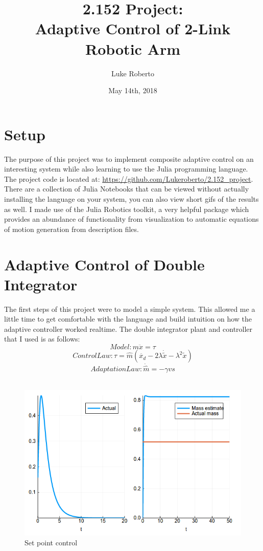 \documentclass[12pt]{article}
\title{\Large \bf 2.152 Project: \\ Adaptive Control of 2-Link Robotic Arm}
\author{\vspace{-6em}Luke Roberto}
\date{\vspace{-4em}May 14th, 2018}
\begin{document}
\vspace{-2em}

\section{Setup}

The purpose of this project was to implement composite adaptive control on an interesting system while also learning to use the Julia programming language. The project code is located at: \url{https://github.com/Lukeroberto/2.152_project}. There are a collection of Julia Notebooks that can be viewed without actually installing the language on your system, you can also view short gifs of the results as well. I made use of the Julia Robotics toolkit, a very helpful package which provides an abundance of functionality from visualization to automatic equations of motion generation from description files.

\section{Adaptive Control of Double Integrator}

The first steps of this project were to model a simple system. This allowed me a little time to get comfortable with the language and build intuition on how the adaptive controller worked realtime. The double integrator plant and controller that I used is as follows:
$$
Model: m\ddot{x} = \tau
$$
$$
Control Law: \tau = \hat{m}(\ddot{x_d} - 2\lambda \dot{\tilde{x}} - \lambda^2  \tilde{x})
$$
$$
Adaptation Law: \dot{\hat{m}} = -\gamma v s
$$
\\

\begin{figure}[H]
    \centering
    \includegraphics[width=3.5in\textsize]{sufficient_richness.png}
    \caption{Set point control}
    \label{fig:double_integrator_suff}
\end{figure}
\end{document}
